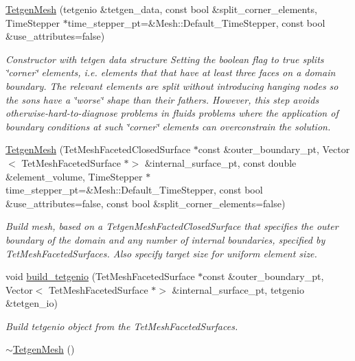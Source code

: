 \begin{DoxyCompactItemize}
\hyperlink{classoomph_1_1TetgenMesh_a0fa783641ea515a942941425c468df01}{Tetgen\+Mesh} (tetgenio \&tetgen\+\_\+data, const bool \&split\+\_\+corner\+\_\+elements, Time\+Stepper $\ast$time\+\_\+stepper\+\_\+pt=\&Mesh\+::\+Default\+\_\+\+Time\+Stepper, const bool \&use\+\_\+attributes=false)
\begin{DoxyCompactList}\small\item\em Constructor with tetgen data structure Setting the boolean flag to true splits \char`\"{}corner\char`\"{} elements, i.\+e. elements that that have at least three faces on a domain boundary. The relevant elements are split without introducing hanging nodes so the sons have a \char`\"{}worse\char`\"{} shape than their fathers. However, this step avoids otherwise-\/hard-\/to-\/diagnose problems in fluids problems where the application of boundary conditions at such \char`\"{}corner\char`\"{} elements can overconstrain the solution. \end{DoxyCompactList}\item 
\hyperlink{classoomph_1_1TetgenMesh_afe49b6f5fc0ff75d8ddfbfab204d6f20}{Tetgen\+Mesh} (Tet\+Mesh\+Faceted\+Closed\+Surface $\ast$const \&outer\+\_\+boundary\+\_\+pt, Vector$<$ Tet\+Mesh\+Faceted\+Surface $\ast$$>$ \&internal\+\_\+surface\+\_\+pt, const double \&element\+\_\+volume, Time\+Stepper $\ast$time\+\_\+stepper\+\_\+pt=\&Mesh\+::\+Default\+\_\+\+Time\+Stepper, const bool \&use\+\_\+attributes=false, const bool \&split\+\_\+corner\+\_\+elements=false)
\begin{DoxyCompactList}\small\item\em Build mesh, based on a Tetgen\+Mesh\+Facted\+Closed\+Surface that specifies the outer boundary of the domain and any number of internal boundaries, specified by Tet\+Mesh\+Faceted\+Surfaces. Also specify target size for uniform element size. \end{DoxyCompactList}\item 
void \hyperlink{classoomph_1_1TetgenMesh_a5a805a008ca5ae48af1aaae06de092b1}{build\+\_\+tetgenio} (Tet\+Mesh\+Faceted\+Surface $\ast$const \&outer\+\_\+boundary\+\_\+pt, Vector$<$ Tet\+Mesh\+Faceted\+Surface $\ast$$>$ \&internal\+\_\+surface\+\_\+pt, tetgenio \&tetgen\+\_\+io)
\begin{DoxyCompactList}\small\item\em Build tetgenio object from the Tet\+Mesh\+Faceted\+Surfaces. \end{DoxyCompactList}\item 
\hyperlink{classoomph_1_1TetgenMesh_a9a83c64b6481463161f6eb87f347ee9e}{$\sim$\+Tetgen\+Mesh} ()

\end{DoxyCompactItemize}
